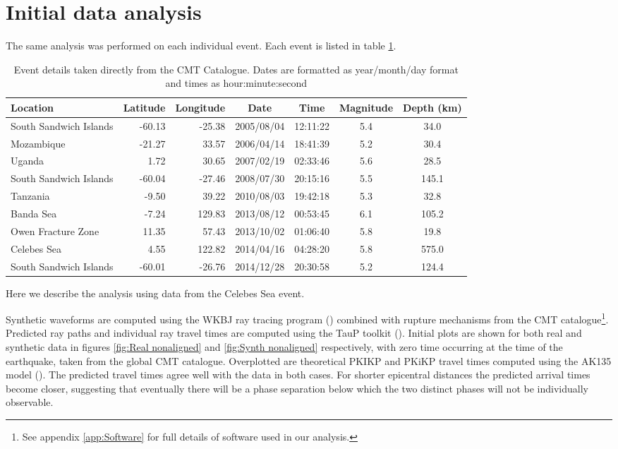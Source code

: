 \documentclass[11pt,a4paper]{article}
\begin{document}
\section{Initial data analysis}
\label{sec:Initial analysis}
The same analysis was performed on each individual event. Each event is listed in table \ref{tab:Events}.
\begin{table}\footnotesize
\centering
\begin{tabular}{| l | r | r | c | c | c | c |}
	\hline Location				& Latitude	& Longitude	& Date		& Time		& Magnitude	& Depth (km) 	\\ \hline
	\hline South Sandwich Islands	& -60.13	& -25.38		& 2005/08/04	& 12:11:22	& 5.4			& 34.0		\\
	\hline Mozambique			& -21.27	& 33.57		& 2006/04/14	& 18:41:39	& 5.2			& 30.4		\\
	\hline Uganda				& 1.72	& 30.65		& 2007/02/19	& 02:33:46	& 5.6			& 28.5		\\
	\hline South Sandwich Islands	& -60.04	& -27.46		& 2008/07/30	& 20:15:16	& 5.5			& 145.1		\\
	\hline Tanzania				& -9.50	& 39.22		& 2010/08/03	& 19:42:18	& 5.3			& 32.8		\\
	\hline Banda Sea			& -7.24	& 129.83		& 2013/08/12	& 00:53:45	& 6.1			& 105.2		\\
	\hline Owen Fracture Zone	& 11.35	& 57.43		& 2013/10/02	& 01:06:40	& 5.8			& 19.8		\\
	\hline Celebes Sea			& 4.55	& 122.82		& 2014/04/16	& 04:28:20	& 5.8			& 575.0  		\\ 
	\hline South Sandwich Islands 	& -60.01	& -26.76		& 2014/12/28	& 20:30:58	& 5.2			& 124.4		\\
	\hline	
\end{tabular}
\caption{Event details taken directly from the CMT Catalogue. Dates are formatted as year/month/day format and times as hour:minute:second}
\label{tab:Events}
\end{table}
Here we describe the analysis using data from the Celebes Sea event.

Synthetic waveforms are computed using the WKBJ ray tracing program (\cite{Chapman1976}) combined with rupture mechanisms from the CMT catalogue\footnote{See appendix \ref{app:Software} for full details of software used in our analysis.}. Predicted ray paths and individual ray travel times are computed using the TauP toolkit (\cite{Crotwell1999}). Initial plots are shown for both real and synthetic data in figures \ref{fig:Real nonaligned} and \ref{fig:Synth nonaligned} respectively, with zero time occurring at the time of the earthquake, taken from the global CMT catalogue. Overplotted are theoretical PKIKP and PKiKP travel times computed using the AK135 model (\cite{Kennett1995b}). The predicted travel times agree well with the data in both cases.  For shorter epicentral distances the predicted arrival times become closer, suggesting that eventually there will be a phase separation below which the two distinct phases will not be individually observable.
\end{document}
